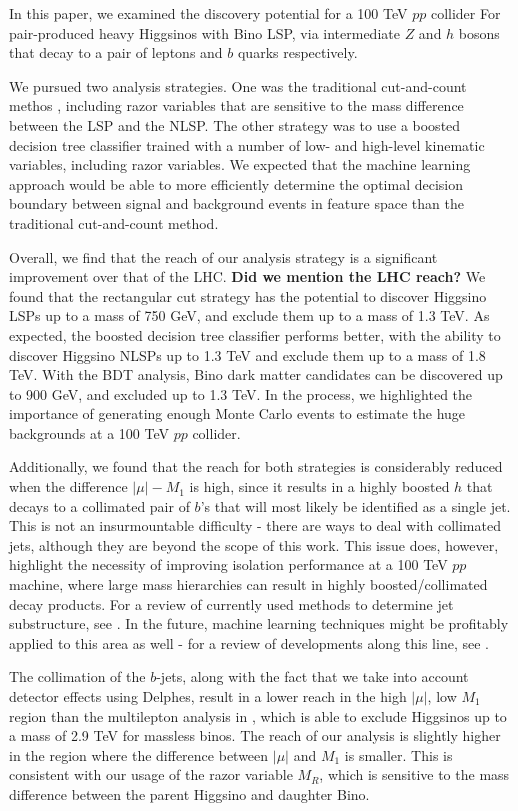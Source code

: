 \documentclass[a4paper,11pt]{article}
\newcommand{\Shufang}[1]{{\bf\color{Maroon}  #1}}
\begin{document}
In this paper, we examined the discovery potential for a 100 TeV $pp$ collider For 
pair-produced heavy Higgsinos with Bino LSP, via 
intermediate $Z$ and $h$ bosons that decay to a pair of leptons and $b$ quarks
respectively.   

We pursued two analysis strategies. One was the traditional cut-and-count methos , including razor variables
that are sensitive to the mass difference between the LSP and the NLSP. The
other strategy was to use a boosted decision tree classifier trained with a
number of low- and high-level kinematic variables, including razor variables. We expected
that the machine learning approach would be able to more efficiently determine
the optimal decision boundary between signal and background events in feature
space than the traditional   cut-and-count method.

Overall, we find that the reach of our analysis strategy is a significant
improvement over that of the LHC.  \Shufang{Did we mention the LHC reach?}  We found that the rectangular cut strategy has
the potential to discover Higgsino LSPs up to a mass of 750 GeV, and exclude
them up to a mass of 1.3 TeV. As expected, the boosted decision tree classifier
performs better, with the ability to discover Higgsino NLSPs up to 1.3 TeV and
exclude them up to a mass of 1.8 TeV. With the BDT analysis, Bino dark matter
candidates can be discovered up to 900 GeV, and excluded up to 1.3 TeV. In the
process, we highlighted the importance of generating enough Monte Carlo events
to estimate the huge backgrounds at a 100 TeV $pp$ collider. 

Additionally, we found that the reach for both strategies is considerably
reduced when the difference $ |\mu|-M_1$ is high, since it results in a highly
boosted $h$ that decays to a collimated pair of $b$'s that will most likely be
identified as a single jet. This is not an insurmountable difficulty - there are
ways to deal with collimated jets, although they are beyond the scope of this
work. This issue does, however, highlight the necessity of improving isolation
performance at a 100 TeV $pp$ machine, where large mass hierarchies can result in
highly boosted/collimated decay products. For a review of currently used methods
to determine jet substructure, see \citep{Shelton:2013an}. In the future,
machine learning techniques might be profitably applied to this area as well -
for a review of developments along this line, see \citep{Schwartzman:2016jqu}. 

The collimation of the $b$-jets, along with the fact that we take into account
detector effects using Delphes, result in a lower reach in the high $|\mu|$, low
$M_1$ region than the multilepton analysis in \citep{Gori:2014oua}, which is
able to exclude Higgsinos up to a mass of 2.9 TeV for massless binos. The reach
of our analysis is slightly higher in the region where the difference between
$|\mu|$ and $M_1$ is smaller. This is consistent with our usage of the razor
variable $M_R$, which is sensitive to the mass difference between the parent
Higgsino and daughter Bino.
\end{document}
